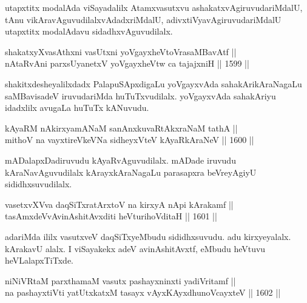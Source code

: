 \begin{artha}
utapxtitx modalAda viSayadalilx Atamxvasutxvu ashakatxvAgiruvudariMdalU, tAnu vikAravAguvudilalxvAdadxriMdalU, adivxtiVyavAgiruvudariMdalU utapxtitx modalAdavu sidadhxvAguvudilalx.
\end{artha}

\begin{shl}
shakatxyXvasAthxni vasUtxni yoVgayxheVtoVrasaMBavAtf || \\
nA\s \s taRvAni parxsUyanetxV yoVgayxheVtw ca tajajxniH ||  1599  || 
\end{shl}

\begin{artha}
shakitxdesheyalilxdadx PalapuSApxdigaLu yoVgayxvAda sahakArikAraNagaLu saMBavisadeV iruvudariMda huTuTxvudilalx. yoVgayxvAda sahakAriyu idadxlilx avugaLa huTuTx kANuvudu.
\end{artha}


\begin{shl}
kAyaRM nAkirxyamANaM sanAnxkuvaRtAkxraNaM tathA || \\
mithoV na vayxtireVkeVNa sidheyxVteV kAyaRkAraNeV \hfill || 1600 ||  
\end{shl}

\begin{artha}
mADalapxDadiruvudu kAyaRvAguvudilalx. mADade iruvudu  kAraNavAguvudilalx kArayxkAraNagaLu parasapxra beVreyAgiyU sididhxsuvudilalx.
\end{artha}


\begin{shl}
vasetxvXVva daqSiTxratArxtoV na kirxyA nApi kArakamf || \\
tasAmxdeVvAvinAshitAvxditi heVturihoVditaH \hfill || 1601 ||  
\end{shl}

\begin{artha}
adariMda ililx vasutxveV daqSiTxyeMbudu sididhxsuvudu. adu kirxyeyalalx. kArakavU alalx. I viSayakekx adeV avinAshitAvxtf, eMbudu heVtuvu heVLalapxTiTxde.
\end{artha}

\begin{shl}
niNiVRtaM parxthamaM vasutx pashayxninxti yadiVritamf || \\
na pashayxtiVti yatUtxkatxM tasayx vAyxKAyx\s dhunoVcayxteV \hfill || 1602 ||  
\end{shl}

